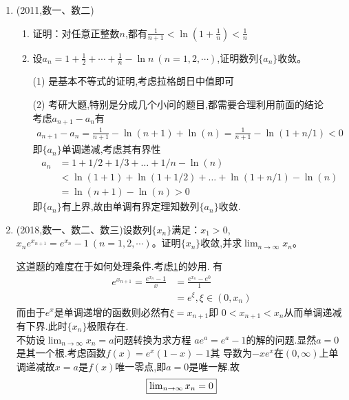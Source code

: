 \documentclass[12pt, a4paper, oneside, UTF8]{ctexbook}
\begin{document}
\begin{enumerate}[label=\arabic*.,start=15]
    \item  (2011,数一、数二)
    \begin{enumerate}[label=(\roman*)]
        \item 证明：对任意正整数$n$,都有$\frac{1}{n+1}<\ln\left(1+\frac{1}{n}\right)<\frac{1}{n}$
        \item 设$a_n=1+\frac{1}{2}+\cdots+\frac{1}{n}-\ln n\ (n=1,2,\cdots)$,证明数列$\{a_n\}$收敛。
    \end{enumerate}
    
    \begin{solution}
    \begin{enumerate}
        \item [(1)] 是基本不等式的证明,考虑拉格朗日中值即可
        \item [(2)] 考研大题,特别是分成几个小问的题目,都需要合理利用前面的结论 \\
        考虑$a_{n+1}-a_{n}$有 
        \begin{align*}
            a_{n+1}-a_{n}=\frac{1}{n+1}-\ln(n+1)+\ln(n) = \frac{1}{n+1}-\ln(1+n/1) < 0
        \end{align*}
        即$\{a_n\}$单调递减,考虑其有界性
        \begin{align*}
            a_n &= 1 + 1/2 + 1/3 +\ldots + 1/n - \ln(n) \\
            & < \ln(1+1) + \ln(1+1/2) + \ldots + \ln(1+n/1) - \ln(n) \\
            & =  \ln (n+1) - \ln(n) > 0 
        \end{align*}
        即$\{a_n\}$有上界,故由单调有界定理知数列$\{a_n\}$收敛.
    \end{enumerate}
    \end{solution}
    
    \item  (2018,数一、数二、数三)设数列$\{x_n\}$满足：$x_1>0$,$x_ne^{x_{n+1}}=e^{x_n}-1\ (n=1,2,\cdots)$。证明$\{x_n\}$收敛,并求$\lim_{n\to\infty}x_n$。
    
    \begin{solution}
    这道题的难度在于如何处理条件.考虑\underline{1}的妙用. 有
    \begin{align*}
        e^{x_{n+1}}=\frac{e^{x_n}-1}{x} &=\frac{e^{x_n}-e^{0}}{1} \\
        &= e^{\xi}, \xi\in(0,x_n)
    \end{align*}
    而由于$e^x$是单调递增的函数则必然有$\xi=x_{n+1}$即 $0<x_{n+1}<x_n$从而单调递减有下界.此时$\{x_n\}$极限存在. \\
    不妨设$\lim_{n\to\infty}x_n=a$问题转换为求方程 $ae^a=e^a-1$的解的问题.显然$a=0$是其一个根.考虑函数$f(x)=e^{x}(1-x)-1$其
    导数为$-xe^x$在$(0,\infty)$上单调递减故$x=a$是$f(x)$唯一零点,即$a=0$是唯一解.故
    $$
    \fbox{$\lim_{n\to\infty}x_n=0$}
    $$
    \end{solution}
    

\end{enumerate}
\end{document}
